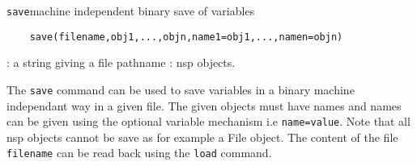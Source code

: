\begin{mandesc}
  \texttt{save}{machine independent binary save of variables}
\end{mandesc}
\label{save}
\begin{calling_sequence}
  \begin{verbatim}
    save(filename,obj1,...,objn,name1=obj1,...,namen=objn)  
  \end{verbatim}
\end{calling_sequence}
\begin{parameters}
  \begin{varlist}
    : a string giving a file pathname 
    : nsp objects. 
  \end{varlist}
\end{parameters}
\begin{mandescription}
  The \verb!save! command can be used to save variables in a binary machine independant way 
  in a given file. The given objects must have names and names can be given using the optional 
  variable mechanism i.e \verb+name=value+. Note that all nsp objects cannot be save as for example 
  a File object. The content of the file \verb+filename+ can be read back using the \verb+load+ command.
\end{mandescription}
\begin{examples}
  \begin{program}
  \end{program}
\end{examples}
\begin{manseealso}
\end{manseealso}

